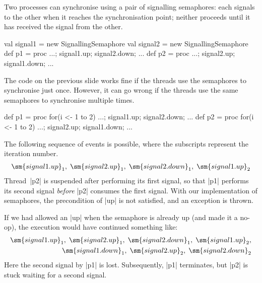 
\begin{slide}

Two processes can synchronise using a pair of signalling semaphores: each
signals to the other when it reaches the synchronisation point; neither
proceeds until it has received the signal from the other.
\begin{scala}
val signal1 = new SignallingSemaphore
val signal2 = new SignallingSemaphore
def p1 = proc{ ...; signal1.up; signal2.down; ... }
def p2 = proc{ ...; signal2.up; signal1.down; ... }
\end{scala}
\end{slide}


\begin{slide}

The code on the previous slide works fine if the threads use the semaphores to
synchronise just once.  However, it can go wrong if the threads use the same
semaphores to synchronise multiple times. 
%
\begin{scala}
def p1 = proc{ for(i <- 1 to 2){ ...; signal1.up; signal2.down; ... } }
def p2 = proc{ for(i <- 1 to 2){ ...; signal2.up; signal1.down; ... } }
\end{scala}
%
The following sequence of events is possible, where the
subscripts represent the iteration number.
\[
\begin{align}
\sm{signal1.up}_1,\; \sm{signal2.up}_1,\; \sm{signal2.down}_1,\;
   \sm{signal1.up}_2
\end{align}
\]
Thread~|p2| is suspended after performing its first signal, so that |p1|
performs its second signal \emph{before} |p2| consumes the first signal. 
With our implementation of semaphores, the precondition of |up| is not
satisfied, and an exception is thrown. 
\end{slide}


\begin{slide}

If we had allowed an |up| when the semaphore is already up (and made it a
no-op), the execution would have continued something like:
\[
\begin{align}
\sm{signal1.up}_1,\; \sm{signal2.up}_1,\; \sm{signal2.down}_1,\;
   \sm{signal1.up}_2, \\
\sm{signal1.down}_1,\; \sm{signal2.up}_2,\; \sm{signal2.down}_2
\end{align}
\]
Here the second signal by |p1| is lost.  Subsequently, |p1| terminates, but
|p2| is stuck waiting for a second signal.
\end{slide}

